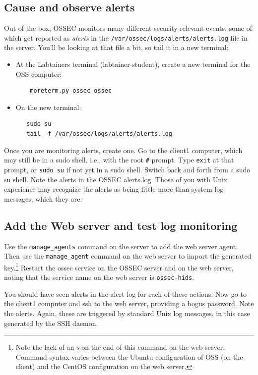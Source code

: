 \subsection{Cause and observe alerts}
Out of the box, OSSEC monitors many different security relevant events, some of which get reported as \textit{alerts} in the
{\tt /var/ossec/logs/alerts/alerts.log} file in the server.  You'll be looking at that file a bit, so tail it in a new terminal:
\begin{itemize}
\item At the Labtainers terminal (labtainer-student), create a new terminal for the OSS computer:
\begin{verbatim}
    moreterm.py ossec ossec
\end{verbatim}
\item On the new terminal:
\begin{verbatim}
   sudo su
   tail -f /var/ossec/logs/alerts/alerts.log
\end{verbatim}
\end{itemize}
Once you are monitoring alerts, create one.  Go to the client1 computer, which may still be in a sudo shell, i.e., with
the root {\tt \#} prompt.  Type {\tt exit} at that prompt, or {\tt sudo su} if not yet in a sudo shell. 
Switch back and forth from a sudo su shell.  Note the alerts in
the OSSEC alerts.log.  Those of you with Unix experience may recognize the alerts as being little more than system log 
messages, which they are.  

\subsection{Add the Web server and test log monitoring}
Use the {\tt manage\_agents} command on the server to add the web server agent.  Then use the {\tt manage\_agent} command
on the web server to import the generated key.\footnote{Note the lack of an \textit{s} on the end of this command on the
web server.  Command syntax varies between the Ubuntu configuration of OSS (on the client) and the CentOS configuration
on the web server.}  Restart the ossec service on the OSSEC server and on the web server, noting that the service name
on the web server is {\tt ossec-hids}.

You should have seen alerts in the alert log for each of these actions.  Now go to the client1 computer and ssh to the web server, 
providing a bogus password.  Note the alerts.  Again, these are triggered by standard Unix log messages, in this case generated
by the SSH daemon.

